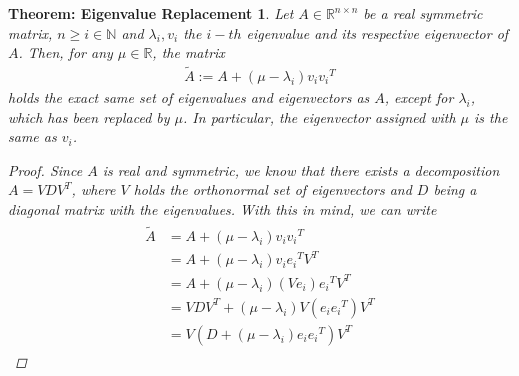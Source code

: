 \documentclass[10pt, a4paper, twocolumn]{article} %
\begin{document}
    \newtheorem{eigenvalueReplacement}[]{Theorem: Eigenvalue Replacement}[section]
    \begin{eigenvalueReplacement}
        Let $A \in \mathbb{R}^{n \times n}$ be a real symmetric matrix, $n \geq i \in \mathbb{N}$ and $\lambda_i, v_i$
        the $i-th$ eigenvalue and its respective eigenvector of $A$. Then, for any $\mu \in \mathbb{R}$, the matrix
        \begin{align}
            \tilde{A} := A + \left(\mu - \lambda_i \right) v_i {v_i}^T
        \end{align}
        holds the exact same set of eigenvalues and eigenvectors as $A$, except for $\lambda_i$, which has been replaced by $\mu$.
        In particular, the eigenvector assigned with $\mu$ is the same as $v_i$.
        \begin{proof}[Proof]
            Since $A$ is real and symmetric, we know that there exists a decomposition $A=VDV^T$, where $V$ holds the orthonormal
            set of eigenvectors and $D$ being a diagonal matrix with the eigenvalues. With this in mind, we can write
            \begin{align}
                \begin{split}
                    \tilde{A} & = A + \left( \mu - \lambda_i \right) v_i {v_i}^T \\
                    & = A + \left( \mu - \lambda_i \right) v_i {e_i}^T V^T \\
                    & = A + \left( \mu - \lambda_i \right) \left( V e_i \right) {e_i}^T V^T \\
                    & = VDV^T + \left( \mu - \lambda_i \right) V \left( e_i {e_i}^T \right) V^T \\
                    & = V\left( D + \left( \mu - \lambda_i \right) e_i {e_i}^T \right) V^T
                \end{split}
            \end{align}
        \end{proof}
    \end{eigenvalueReplacement}
\end{document}
